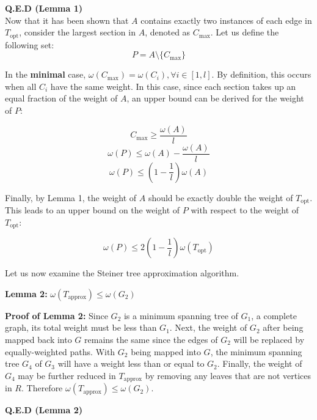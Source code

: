     \textbf{Q.E.D (Lemma 1)} \\

    Now that it has been shown that $A$ contains exactly two instances of each edge in $T_{\text{opt}}$, consider the largest section in $A$, denoted as $C_{\text{max}}$.
    Let us define the following set:
    \[P = A \text{\textbackslash} \{C_{\text{max}}\}\]

    In the \textbf{minimal} case, $\omega(C_{\text{max}}) = \omega(C_i), \forall i \in [1, l]$.
    By definition, this occurs when all $C_i$ have the same weight.
    In this case, since each section takes up an equal fraction of the weight of $A$, an upper bound can be derived for the weight of $P$:

    \[C_{\text{max}} \ge \frac{\omega{(A)}}{l}\]
    \[\omega{(P)} \le \omega{(A)} - \frac{\omega{(A)}}{l}\]
    \[\omega{(P)} \le (1 - \frac{1}{l})\omega{(A)}\]

    Finally, by Lemma 1, the weight of $A$ should be exactly double the weight of $T_{\text{opt}}$.
    This leads to an upper bound on the weight of $P$ with respect to the weight of $T_{\text{opt}}$:

    \begin{equation}
        \omega{(P)} \le 2(1 - \frac{1}{l})\omega{(T_{\text{opt}})}
        \label{eqn:p}
    \end{equation}

    Let us now examine the Steiner tree approximation algorithm.\vspace{3mm}

    \textbf{Lemma 2:} $\omega{(T_{\text{approx}})} \le \omega{(G_2)}$\vspace{3mm}

    \textbf{Proof of Lemma 2:}
    Since $G_2$ is a minimum spanning tree of $G_1$, a complete graph, its total weight must be less than $G_1$.
    Next, the weight of $G_2$ after being mapped back into $G$ remains the same since the edges of $G_2$ will be replaced by equally-weighted paths.
    With $G_2$ being mapped into $G$, the minimum spanning tree $G_4$ of $G_3$ will have a weight less than or equal to $G_2$.
    Finally, the weight of $G_4$ may be further reduced in $T_{\text{approx}}$ by removing any leaves that are not vertices in $R$.
    Therefore $\omega{(T_{\text{approx}})} \le \omega{(G_2)}$.

    \textbf{Q.E.D (Lemma 2)}\\

